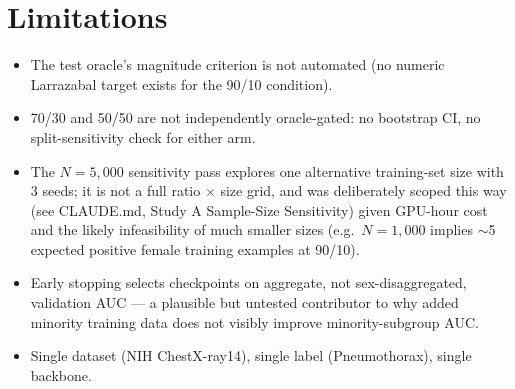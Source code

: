 \documentclass[11pt]{article}
\begin{document}
\section{Limitations}
\begin{itemize}
\item The test oracle's magnitude criterion is not automated (no numeric Larrazabal target exists for the 90/10 condition).
\item 70/30 and 50/50 are not independently oracle-gated: no bootstrap CI, no split-sensitivity check for either arm.
\item The $N=5{,}000$ sensitivity pass explores one alternative training-set size with 3 seeds; it is not a full ratio $\times$ size grid, and was deliberately scoped this way (see CLAUDE.md, Study A Sample-Size Sensitivity) given GPU-hour cost and the likely infeasibility of much smaller sizes (e.g.\ $N=1{,}000$ implies $\sim$5 expected positive female training examples at 90/10).
\item Early stopping selects checkpoints on aggregate, not sex-disaggregated, validation AUC — a plausible but untested contributor to why added minority training data does not visibly improve minority-subgroup AUC.
\item Single dataset (NIH ChestX-ray14), single label (Pneumothorax), single backbone.
\end{itemize}
\end{document}
